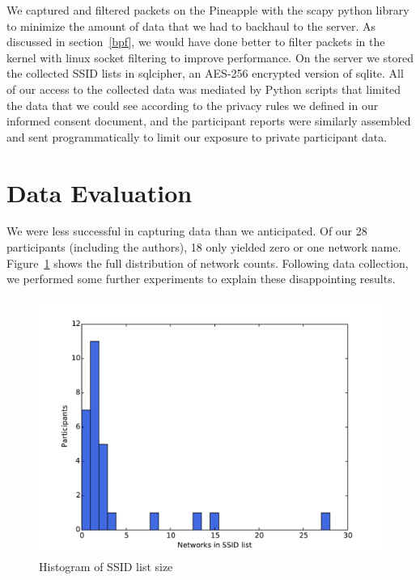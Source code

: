 \documentclass[letterpaper,twocolumn,10pt]{article}
\begin{document}
We captured and filtered packets on the Pineapple with the scapy python library to minimize the amount of data that we had to backhaul to the server. As discussed in section~\ref{bpf}, we would have done better to filter packets in the kernel with linux socket filtering to improve performance. On the server we stored the collected SSID lists in sqlcipher, an AES-256 encrypted version of sqlite. All of our access to the collected data was mediated by Python scripts that limited the data that we could see according to the privacy rules we defined in our informed consent document, and the participant reports were similarly assembled and sent programmatically to limit our exposure to private participant data.

\section{Data Evaluation}
We were less successful in capturing data than we anticipated. Of our 28 participants (including the authors), 18 only yielded zero or one network name. Figure~\ref{histogram} shows the full distribution of network counts. Following data collection, we performed some further experiments to explain these disappointing results.

\begin{figure}
\includegraphics[width=\columnwidth]{hist.pdf}
\caption{Histogram of SSID list size}
\label{histogram}
\end{figure}

\FloatBarrier
\end{document}
